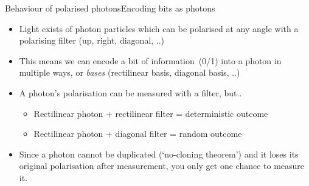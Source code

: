 \documentclass{beamer}
\begin{document}
\begin{frame}{Behaviour of polarised photons}{Encoding bits as photons}

    \begin{itemize}
        \item Light exists of photon particles which can be polarised at any angle with a polarising filter (up, right, diagonal, ..)
        \item This means we can encode a bit of information~(0/1) into a photon in multiple ways, or \emph{bases} (rectilinear basis, diagonal basis, ..)
        \item A photon's polarisation can be measured with a filter, but..
        \begin{itemize}
            \item Rectilinear photon + rectilinear filter = deterministic outcome
            \item Rectilinear photon + diagonal filter = random outcome
        \end{itemize}
        \item Since a photon cannot be duplicated (`no-cloning theorem') and it loses its original polarisation after measurement, you only get one chance to measure it.
    \end{itemize}
    

    
\end{frame}
\end{document}
